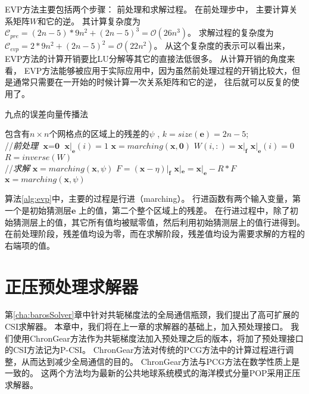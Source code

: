  
EVP方法主要包括两个步骤： 前处理和求解过程。 
在前处理步中， 主要计算关系矩阵$W$和它的逆。 其计算复杂度为$\mathcal{C}_{pre}=
(2n-5)* 9n^2 + (2n-5)^3 = \mathcal {O} (26n^3)$。 
求解过程的复杂度为$\mathcal{C}_{evp}= 2* 9n^2 + (2n-5)^2 = \mathcal{O} (22n^2)$。 
从这个复杂度的表示可以看出来，EVP方法的计算开销要比LU分解等其它的直接法低很多。 
从计算开销的角度来看， EVP方法能够被应用于实际应用中，因为虽然前处理过程的开销比较大，但是通常只需要在一开始的时候计算一次关系矩阵和它的逆， 往后就可以反复的使用了。

\begin{algorithm}[t!]
\caption{九点的误差向量传播法}
\label{alg:evp}
\begin{algorithmic}[1]
\REQUIRE 包含有$n\times n$个网格点的区域上的残差的$\psi$ , $k = size(\textbf{e})=2n-5$; \\
//\qquad \textit{前处理}
\STATE  $\textbf{x} = \textbf{0}$
\STATE $\textbf{x}|_\textbf{e}(i) = 1$
\STATE $\textbf{x} = marching(\textbf{x},\textbf{0})$
\STATE $W(i,:) = \textbf{x}|_\textbf{f}$
\STATE $\textbf{x}|_\textbf{e}(i) = 0$
\ENDFOR
\STATE $R = inverse(W)$ \\
//\qquad \textit{求解 }
\STATE $\textbf{x}= marching(\textbf{x},\psi)$
\STATE $F = (\textbf{x} - \eta)|_\textbf{f}$ 
\STATE $\textbf{x}|_\textbf{e} =\textbf{x}|_\textbf{e} - R*F$ 
\STATE $\textbf{x} = marching(\textbf{x},\psi)$
\end{algorithmic}
\end{algorithm}

算法\ref{alg:evp}中，主要的过程是行进（marching）。
行进函数有两个输入变量，第一个是初始猜测层$\textbf{e}$ 上的值，第二个整个区域上的残差。 
在行进过程中，除了初始猜测层上的值，其它所有值均被赋零值，然后利用初始猜测层上的值行进得到。
在前处理阶段，残差值均设为零，而在求解阶段，残差值均设为需要求解的方程的右端项的值。

\section{正压预处理求解器}
第\ref{cha:barosSolver}章中针对共轭梯度法的全局通信瓶颈，我们提出了高可扩展的CSI求解器。 
本章中，我们将在上一章的求解器的基础上，加入预处理接口。
我们使用ChronGear方法作为共轭梯度法加入预处理之后的版本，将加了预处理接口的CSI方法记为P-CSI。
ChronGear方法对传统的PCG方法中的计算过程进行调整，从而达到减少全局通信的目的。
ChronGear方法与PCG方法在数学性质上是一致的。
这两个方法均为最新的公共地球系统模式的海洋模式分量POP采用正压求解器\cite{yong2015}。 


